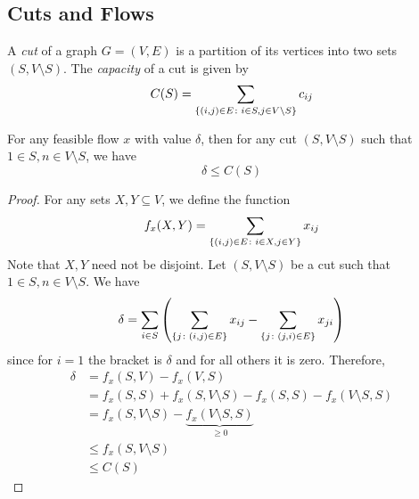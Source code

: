 \subsection{Cuts and Flows}
\begin{definition}
	A \textit{cut} of a graph \( G = (V, E) \) is a partition of its vertices into two sets \( (S, V \setminus S) \).
	The \textit{capacity} of a cut is given by
	\[
		C(S) = \sum_{\qty{(i,j) \in E \colon i \in S, j \in V \setminus S}} c_{ij}
	\]
\end{definition}
\begin{theorem}
	For any feasible flow \( x \) with value \( \delta \), then for any cut \( (S, V \setminus S) \) such that \( 1 \in S, n \in V \setminus S \), we have
	\[
		\delta \leq C(S)
	\]
\end{theorem}
\begin{proof}
	For any sets \( X, Y \subseteq V \), we define the function
	\[
		f_x(X, Y) = \sum_{\qty{(i,j) \in E \colon i \in X, j \in Y}} x_{ij}
	\]
	Note that \( X, Y \) need not be disjoint.
	Let \( (S, V \setminus S) \) be a cut such that \( 1 \in S, n \in V \setminus S \).
	We have
	\[
		\delta = \sum_{i \in S} \qty( \sum_{\qty{j \colon (i,j) \in E}} x_{ij} - \sum_{\qty{j \colon (j,i) \in E}} x_{ji} )
	\]
	since for \( i = 1 \) the bracket is \( \delta \) and for all others it is zero.
	Therefore,
	\begin{align*}
		\delta & = f_x(S, V) - f_x(V, S)                                                 \\
		       & = f_x(S, S) + f_x(S, V \setminus S) - f_x(S, S) - f_x(V \setminus S, S) \\
		       & = f_x(S, V \setminus S) - \underbrace{f_x(V \setminus S, S)}_{\geq 0}   \\
		       & \leq f_x(S, V \setminus S)                                              \\
		       & \leq C(S)
	\end{align*}
\end{proof}

